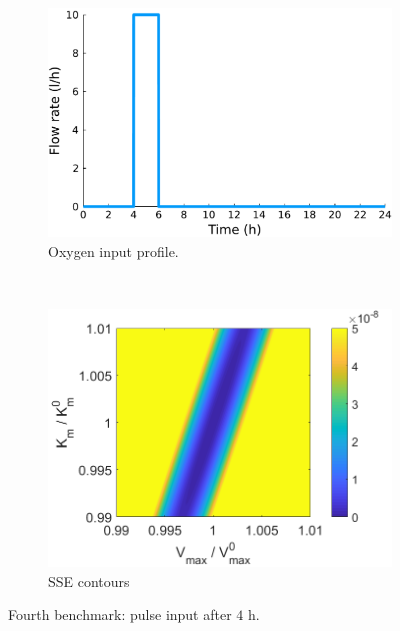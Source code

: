 \begin{figure}[H]
	\centering
	\begin{subfigure}[b]{0.45\textwidth}
		\includegraphics[width=\textwidth]{figure/paper 1/extra5}
		\caption{Oxygen input profile.}
		\label{inputcompare4}
	\end{subfigure}
	~ %
	\begin{subfigure}[b]{0.45\textwidth}
		\includegraphics[width=\textwidth]{figure/paper 1/compare4.png}
		\caption{SSE contours}
		\label{SSEcompare4}
	\end{subfigure}
	\caption{Fourth benchmark: pulse input after $4 \text{ h}$.}
	\label{compare4}
\end{figure}
